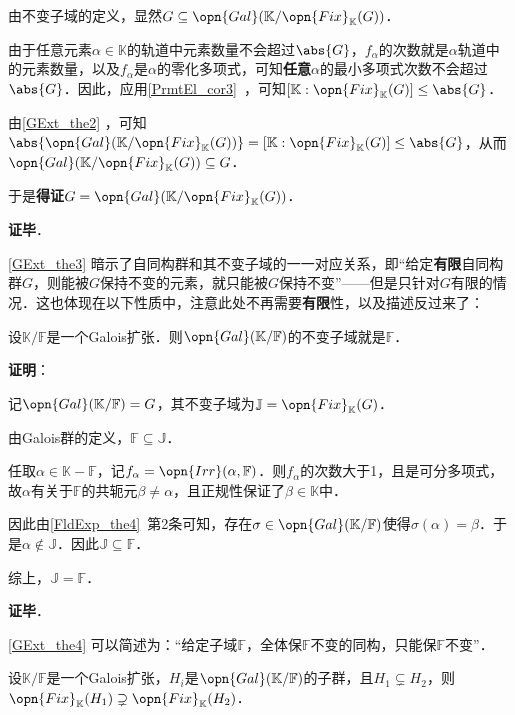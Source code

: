 由不变子域的定义，显然$G\subseteq\opn{Gal}(\mathbb{K}/\opn{Fix}_\mathbb{K}(G))$．

由于任意元素$\alpha\in\mathbb{K}$的轨道中元素数量不会超过$\abs{G}$，$f_\alpha$的次数就是$\alpha$轨道中的元素数量，以及$f_\alpha$是$\alpha$的零化多项式，可知\textbf{任意}$\alpha$的最小多项式次数不会超过$\abs{G}$．因此，应用\autoref{PrmtEl_cor3}~，可知$[\mathbb{K}:\opn{Fix}_\mathbb{K}(G)]\leq \abs{G}$．

由\autoref{GExt_the2} ，可知$\abs{\opn{Gal}(\mathbb{K}/\opn{Fix}_\mathbb{K}(G))}=[\mathbb{K}:\opn{Fix}_\mathbb{K}(G)]\leq\abs{G}$，从而$\opn{Gal}(\mathbb{K}/\opn{Fix}_\mathbb{K}(G))\subseteq G$．

于是\textbf{得证}$G = \opn{Gal}(\mathbb{K}/\opn{Fix}_\mathbb{K}(G))$．

\textbf{证毕}．


\autoref{GExt_the3} 暗示了自同构群和其不变子域的一一对应关系，即“给定\textbf{有限}自同构群$G$，则能被$G$保持不变的元素，就只能被$G$保持不变”——但是只针对$G$有限的情况．这也体现在以下性质中，注意此处不再需要\textbf{有限}性，以及描述反过来了：



\begin{theorem}{}\label{GExt_the4}
设$\mathbb{K}/\mathbb{F}$是一个Galois扩张．则$\opn{Gal}(\mathbb{K}/\mathbb{F})$的不变子域就是$\mathbb{F}$．
\end{theorem}

\textbf{证明}：

记$\opn{Gal}(\mathbb{K}/\mathbb{F})=G$，其不变子域为$\mathbb{J}=\opn{Fix}_\mathbb{K}(G)$．

由Galois群的定义，$\mathbb{F}\subseteq\mathbb{J}$．

任取$\alpha\in\mathbb{K}-\mathbb{F}$，记$f_\alpha=\opn{Irr}(\alpha, \mathbb{F})$．则$f_\alpha$的次数大于1，且是可分多项式，故$\alpha$有关于$\mathbb{F}$的共轭元$\beta\neq \alpha$，且正规性保证了$\beta\in\mathbb{K}$中．

因此由\autoref{FldExp_the4}~第2条可知，存在$\sigma\in\opn{Gal}(\mathbb{K}/\mathbb{F})$使得$\sigma(\alpha)=\beta$．于是$\alpha\not\in \mathbb{J}$．因此$\mathbb{J}\subseteq\mathbb{F}$．

综上，$\mathbb{J}=\mathbb{F}$．

\textbf{证毕}．


\autoref{GExt_the4} 可以简述为：“给定子域$\mathbb{F}$，全体保$\mathbb{F}$不变的同构，只能保$\mathbb{F}$不变”．


\begin{corollary}{}\label{GExt_cor1}
设$\mathbb{K}/\mathbb{F}$是一个Galois扩张，$H_i$是$\opn{Gal}(\mathbb{K}/\mathbb{F})$的子群，且$H_1\subsetneq H_2$，则$\opn{Fix}_\mathbb{K}(H_1)\supsetneq \opn{Fix}_\mathbb{K}(H_2)$．
\end{corollary}

